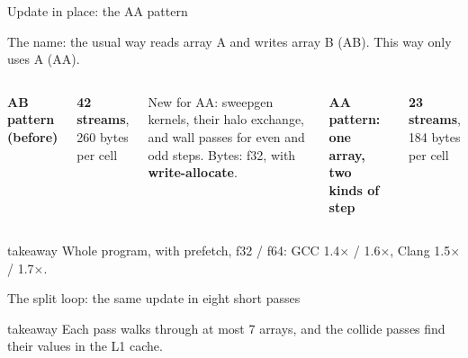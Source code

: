 \documentclass[aspectratio=169,10pt,t]{beamer}
\newcommand{\sx}[1]{#1\ensuremath{\times}} %
\newcommand{\term}[1]{\textcolor{psblue!85!black}{\textbf{#1}}} %
\newcommand{\takeaway}[1]{\par\vfill
  \begin{beamercolorbox}[wd=\textwidth,sep=4pt,rounded=true]{takeaway}
    \small #1
  \end{beamercolorbox}}
\begin{document}
\begin{frame}{Update in place: the AA pattern}
  \vspace{1mm}
  {\small The name: the usual way reads array A and writes array B (AB). This way only uses A (AA).\par}
  \begin{columns}[T,onlytextwidth]
    {\small\bfseries AB pattern (before)\par}
    \vspace{3mm}
    \centering

    \vspace{1mm}
    {\small\textbf{42 streams}, 260 bytes per cell\par}

    \vspace{3mm}
    {\scriptsize\color{psgray}New for AA: sweepgen kernels, their halo exchange, and wall passes for
    even and odd steps. Bytes: f32, with \term{write-allocate}.\par}
    {\small\bfseries AA pattern: one array, two kinds of step\par}
    \vspace{1mm}
    \centering

    \vspace{1mm}
    {\small\textbf{23 streams}, 184 bytes per cell\par}
  \end{columns}
  \takeaway{Whole program, with prefetch, f32 / f64: GCC \sx{1.4} / \sx{1.6}, Clang \sx{1.5} / \sx{1.7}.}
\end{frame}

\begin{frame}{The split loop: the same update in eight short passes}
  \vspace{5mm}
  \centering
  \takeaway{Each pass walks through at most 7 arrays, and the collide passes find their values in the L1
    cache.}
\end{frame}
\end{document}
